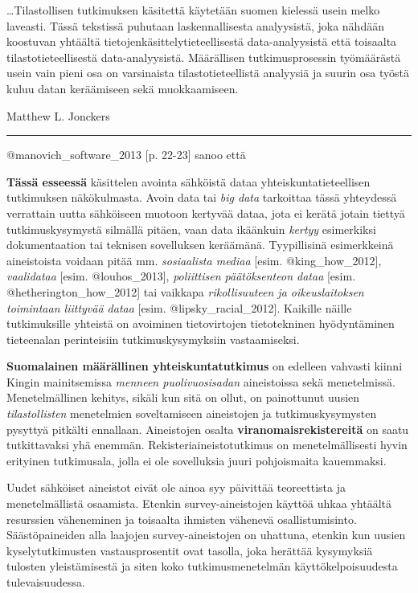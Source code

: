 \ldots{}Tilastollisen tutkimuksen käsitettä käytetään suomen kielessä
usein melko laveasti. Tässä tekstissä puhutaan laskennallisesta
analyysistä, joka nähdään koostuvan yhtäältä
tietojenkäsittelytieteellisestä data-analyysistä että toisaalta
tilastotieteellisestä data-analyysistä. Määrällisen tutkimusprosessin
työmäärästä usein vain pieni osa on varsinaista tilastotieteellistä
analyysiä ja suurin osa työstä kuluu datan keräämiseen sekä
muokkaamiseen.

Matthew L. Jonckers

\begin{center}\rule{3in}{0.4pt}\end{center}

@manovich\_software\_2013 {[}p. 22-23{]} sanoo että

\textbf{Tässä esseessä} käsittelen avointa sähköistä dataa
yhteiskuntatieteellisen tutkimuksen näkökulmasta. Avoin data tai
\emph{big data} tarkoittaa tässä yhteydessä verrattain uutta sähköiseen
muotoon kertyvää dataa, jota ei kerätä jotain tiettyä tutkimuskysymystä
silmällä pitäen, vaan data ikäänkuin \emph{kertyy} esimerkiksi
dokumentaation tai teknisen sovelluksen keräämänä. Tyypillisinä
esimerkkeinä aineistoista voidaan pitää mm. \emph{sosiaalista mediaa}
{[}esim. @king\_how\_2012{]}, \emph{vaalidataa} {[}esim.
@louhos\_2013{]}, \emph{poliittisen päätöksenteon dataa} {[}esim.
@hetherington\_how\_2012{]} tai vaikkapa \emph{rikollisuuteen ja
oikeuslaitoksen toimintaan liittyvää dataa} {[}esim.
@lipsky\_racial\_2012{]}. Kaikille näille tutkimuksille yhteistä on
avoiminen tietovirtojen tietotekninen hyödyntäminen tieteenalan
perinteisiin tutkimuskysymyksiin vastaamiseksi.

\textbf{Suomalainen määrällinen yhteiskuntatutkimus} on edelleen
vahvasti kiinni Kingin mainitsemissa \emph{menneen puolivuosisadan}
aineistoissa sekä menetelmissä. Menetelmällinen kehitys, sikäli kun sitä
on ollut, on painottunut uusien \emph{tilastollisten} menetelmien
soveltamiseen aineistojen ja tutkimuskysymysten pysyttyä pitkälti
ennallaan. Aineistojen osalta \textbf{viranomaisrekistereitä} on saatu
tutkittavaksi yhä enemmän. Rekisteriaineistotutkimus on
menetelmällisesti hyvin erityinen tutkimusala, jolla ei ole sovelluksia
juuri pohjoismaita kauemmaksi.

Uudet sähköiset aineistot eivät ole ainoa syy päivittää teoreettista ja
menetelmällistä osaamista. Etenkin survey-aineistojen käyttöä uhkaa
yhtäältä resurssien väheneminen ja toisaalta ihmisten vähenevä
osallistumisinto. Säästöpaineiden alla laajojen survey-aineistojen on
uhattuna, etenkin kun uusien kyselytutkimusten vastausprosentit ovat
tasolla, joka herättää kysymyksiä tulosten yleistämisestä ja siten koko
tutkimusmenetelmän käyttökelpoisuudesta tulevaisuudessa.

